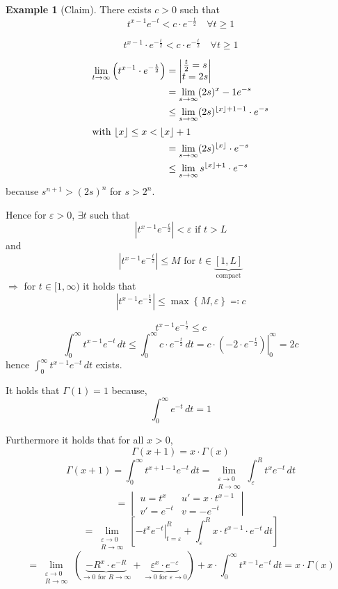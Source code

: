 \documentclass[a4paper,landscape,twocolumn]{article}
\theoremstyle{definition}
\newtheorem{ex}{Example}
\newcommand\abs[1]{\left|#1\right|}
\begin{document}
\begin{ex}[Claim]
  There exists $c > 0$ such that
  \[ t^{x-1} e^{-t} < c \cdot e^{-\frac t2} \quad \forall t \geq 1 \]

  \[ t^{x-1} \cdot e^{-\frac t2} < c \cdot e^{-\frac t2} \quad \forall t \geq 1 \]

  \begin{align*}
    \lim_{t\to\infty} \left(t^{x-1} \cdot e^{-\frac t2}\right)
    &= \begin{vmatrix} \frac t2 = s \\ t = 2s \end{vmatrix} \\
    &= \lim_{s\to\infty} (2s)^x-1 e^{-s} \\
    &\leq \lim_{s\to\infty} (2s)^{\lfloor x\rfloor + 1 - 1} \cdot e^{-s} \\
  \intertext{with $\lfloor x\rfloor \leq x < \lfloor x\rfloor + 1$}
    &= \lim_{s\to\infty} (2s)^{\lfloor x\rfloor} \cdot e^{-s} \\
    &\leq  \lim_{s\to\infty} s^{\lfloor x\rfloor + 1} \cdot e^{-s}
  \end{align*}
  because $s^{n+1} > (2s)^n$ for $s > 2^n$.

  Hence for $\varepsilon > 0$, $\exists t$ such that
  \[ \abs{t^{x-1} e^{-\frac t2}} < \varepsilon \text{ if } t > L \]
  and
  \[ \abs{t^{x-1} e^{-\frac t2}} \leq M \text{ for } t \in \underbrace{[1,L]}_{\text{compact}} \]
  $\Rightarrow$ for $t \in [1,\infty)$ it holds that
  \[
    \abs{t^{x-1} e^{-\frac t2}} \leq \max\left\{M, \varepsilon\right\} \eqqcolon c
  \]

  \[ t^{x-1} e^{-\frac t2} \leq c \]
  \[
    \int_0^\infty t^{x-1} e^{-t} \, dt
      \leq \int_0^\infty c \cdot e^{-\frac t2} \, dt
      = \left.c \cdot \left(-2 \cdot e^{-\frac t2}\right) \right|_0^\infty
      = 2c
  \]
  hence $\int_0^\infty t^{x-1} e^{-t} \, dt$ exists.

  It holds that $\Gamma(1) = 1$ because,
  \[ \int_0^\infty e^{-t} \, dt = 1 \]

  Furthermore it holds that for all $x > 0$,
  \[ \Gamma(x+1) = x \cdot \Gamma(x) \]
  \[
    \Gamma(x+1) = \int_0^\infty t^{x+1-1} e^{-t} \, dt
    = \lim_{\substack{\varepsilon \to 0 \\ R \to \infty}} \int_\varepsilon^R t^x e^{-t} \, dt
  \] \[
    = \begin{vmatrix}
      u = t^x & u' = x \cdot t^{x-1} \\
      v' = e^{-t} & v = -e^{-t}
    \end{vmatrix}
  \] \[
    = \lim_{\substack{\varepsilon \to 0 \\ R \to \infty}}\left[
      \left. -t^x e^{-t} \right|_{t=\varepsilon}^R
      + \int_\varepsilon^R x \cdot t^{x-1} \cdot e^{-t} \, dt
    \right]
  \] \[
    = \lim_{\substack{\varepsilon \to 0 \\ R \to \infty}} \left(
      \underbrace{-R^x \cdot e^{-R}}_{\to 0 \text{ for } R \to \infty} +
      \underbrace{\varepsilon^x \cdot e^{-\varepsilon}}_{\to 0 \text{ for } \varepsilon \to 0}
    \right) + x \cdot \int_0^\infty t^{x-1} e^{-t} \, dt
    = x \cdot \Gamma(x)
  \]


\end{ex}
\end{document}
